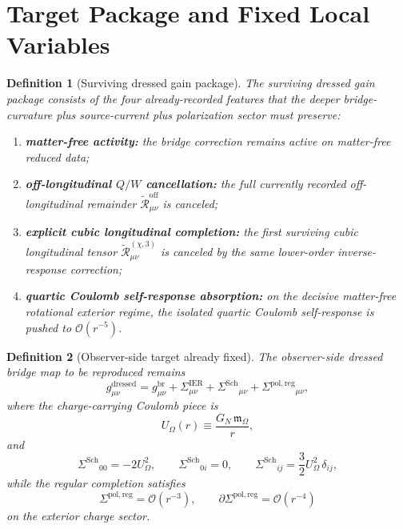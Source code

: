 \documentclass[11pt]{article}
\newcommand{\CoulPot}{U_\Omega}
\newcommand{\HamChargeOmega}{\mathfrak m_\Omega}
\newcommand{\SigmaIER}{\Sigma^{\mathrm{IER}}}
\newcommand{\SigmaDressSch}{\Sigma^{\mathrm{Sch}}}
\newcommand{\SigmaRegPol}{\Sigma^{\mathrm{pol,reg}}}
\newcommand{\ReOff}{\widetilde{\mathcal R}_{\mu\nu}^{\mathrm{off}}}
\newcommand{\ReLongThree}{\widetilde{\mathcal R}_{\mu\nu}^{(\chi,3)}}
\newtheorem{definition}{Definition}
\begin{document}
\section{Target Package and Fixed Local Variables}

\begin{definition}[Surviving dressed gain package]
\label{def:gains}
The \emph{surviving dressed gain package} consists of the four already-recorded features that the deeper bridge-curvature plus source-current plus polarization sector must preserve:
\begin{enumerate}
    \item \textbf{matter-free activity:} the bridge correction remains active on matter-free reduced data;
    \item \textbf{off-longitudinal \(Q/W\) cancellation:} the full currently recorded off-longitudinal remainder \(\ReOff\) is canceled;
    \item \textbf{explicit cubic longitudinal completion:} the first surviving cubic longitudinal tensor \(\ReLongThree\) is canceled by the same lower-order inverse-response correction;
    \item \textbf{quartic Coulomb self-response absorption:} on the decisive matter-free rotational exterior regime, the isolated quartic Coulomb self-response is pushed to \(\mathcal O(r^{-5})\).
\end{enumerate}
\end{definition}

\begin{definition}[Observer-side target already fixed]
\label{def:target}
The observer-side dressed bridge map to be reproduced remains
\begin{equation}
g_{\mu\nu}^{\mathrm{dressed}}
=
g_{\mu\nu}^{\mathrm{br}}
+\SigmaIER_{\mu\nu}
+\SigmaDressSch{}_{\mu\nu}
+\SigmaRegPol{}_{\mu\nu},
\label{eq:targetmetric}
\end{equation}
where the charge-carrying Coulomb piece is
\begin{equation}
\CoulPot(r)\equiv \frac{G_N\,\HamChargeOmega}{r},
\label{eq:coulpot}
\end{equation}
and
\begin{equation}
\SigmaDressSch{}_{00}=-2\CoulPot^2,
\qquad
\SigmaDressSch{}_{0i}=0,
\qquad
\SigmaDressSch{}_{ij}=\frac32\CoulPot^2\,\delta_{ij},
\label{eq:schdress}
\end{equation}
while the regular completion satisfies
\begin{equation}
\SigmaRegPol=\mathcal O(r^{-3}),
\qquad
\partial\SigmaRegPol=\mathcal O(r^{-4})
\label{eq:reg}
\end{equation}
on the exterior charge sector.
\end{definition}
\end{document}
